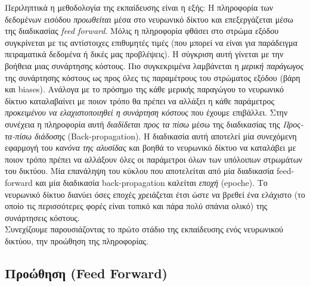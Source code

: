 \documentclass[11pt]{article} %
\numberwithin{equation}{subsection}
\begin{document}
Περιληπτικά η μεθοδολογία της εκπαίδευσης είναι η εξής: Η πληροφορία των δεδομένων εισόδου \textit{προωθείται} μέσα στο νευρωνικό δίκτυο και επεξεργάζεται μέσω της διαδικασίας \textit{feed forward}. Μόλις η πληροφορία φθάσει στο στρώμα εξόδου συγκρίνεται με τις αντίστοιχες επιθυμητές τιμές (που μπορεί να είναι για παράδειγμα πειραματικά δεδομένα ή δικές μας προβλέψεις). Η σύγκριση αυτή γίνεται με την βοήθεια μιας συνάρτησης κόστους. Πιο συγκεκριμένα λαμβάνεται η \textit{μερική παράγωγος} της συνάρτησης κόστους ως προς όλες τις παραμέτρους του στρώματος εξόδου (βάρη και biases). Ανάλογα με το πρόσημο της κάθε μερικής παραγώγου το νευρωνικό δίκτυο καταλαβαίνει με ποιον τρόπο θα πρέπει να αλλάξει η κάθε παράμετρος \textit{προκειμένου να ελαχιστοποιηθεί η συνάρτηση κόστους} που έχουμε επιβάλλει. Στην συνέχεια η πληροφορία αυτή \textit{διαδίδεται προς τα πίσω} μέσω της διαδικασίας της \textit{Προς-τα-πίσω διάδοσης} (Back-propagation). Η διαδικασία αυτή αποτελεί μία συνεχόμενη εφαρμογή του \textit{κανόνα της αλυσίδας} και βοηθά το νευρωνικό δίκτυο να καταλάβει με ποιον τρόπο πρέπει να αλλάξουν όλες οι παράμετροι όλων των υπόλοιπων στρωμάτων του δικτύου. Μία επανάληψη του κύκλου που αποτελείται από μία διαδικασία feed-forward και μία διαδικασία back-propagation καλείται \textit{εποχή} (epoche). Το νευρωνικό δίκτυο διανύει όσες εποχές χρειάζεται έτσι ώστε να βρεθεί ένα ελάχιστο (το οποίο τις περισσότερες φορές είναι τοπικό και πάρα πολύ σπάνια ολικό) της συνάρτησεις κόστους. \\

Συνεχίζουμε παρουσιάζοντας το πρώτο στάδιο της εκπαίδευσης ενός νευρωνικού δικτύου, την προώθηση της πληροφορίας.\\


\subsection{Προώθηση (Feed Forward)}  
\end{document}
